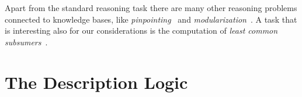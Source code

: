 Apart from the standard reasoning task there are many other reasoning problems connected
to knowledge bases, like \emph{pinpointing}~\cite{DBLP:phd/de/Nyssen2009a} and
\emph{modularization}~\cite{DBLP:conf/www/GrauHKS07}.  A task that is interesting also for
our considerations is the computation of \emph{least common
  subsumers}~\cite{DBLP:phd/de/Turhan2007,DBLP:conf/ijcai/Baader03}.

\begin{Definition}
  \label{def:least-common-subsumer}
  
\end{Definition}

\section{The Description Logic \ELgfpbot}
\label{sec:descr-logics-elbot}

%
%
%


